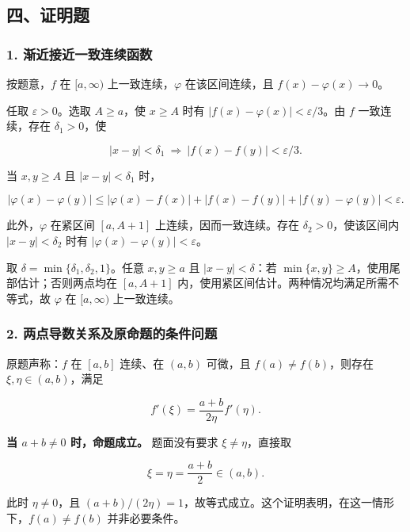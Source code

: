 \documentclass[11pt,fontset=fandol]{ctexart}
\begin{document}
\subsection{四、证明题}\label{ux56dbux8bc1ux660eux9898}

\subsubsection{1.
渐近接近一致连续函数}\label{ux6e10ux8fd1ux63a5ux8fd1ux4e00ux81f4ux8fdeux7eedux51fdux6570}

按题意，\(f\) 在 \([a,\infty)\) 上一致连续，\(\varphi\) 在该区间连续，且
\(f(x)-\varphi(x)\to0\)。

任取 \(\varepsilon>0\)。选取 \(A\ge a\)，使 \(x\ge A\) 时有
\(|f(x)-\varphi(x)|<\varepsilon/3\)。由 \(f\) 一致连续，存在
\(\delta_1>0\)，使

\[
|x-y|<\delta_1\ \Longrightarrow\ |f(x)-f(y)|<\varepsilon/3.
\]

当 \(x,y\ge A\) 且 \(|x-y|<\delta_1\) 时，

\[
|\varphi(x)-\varphi(y)|
\le|\varphi(x)-f(x)|+|f(x)-f(y)|+|f(y)-\varphi(y)|<\varepsilon.
\]

此外，\(\varphi\) 在紧区间 \([a,A+1]\) 上连续，因而一致连续。存在
\(\delta_2>0\)，使该区间内 \(|x-y|<\delta_2\) 时有
\(|\varphi(x)-\varphi(y)|<\varepsilon\)。

取 \(\delta=\min\{\delta_1,\delta_2,1\}\)。任意 \(x,y\ge a\) 且
\(|x-y|<\delta\)：若 \(\min\{x,y\}\ge A\)，使用尾部估计；否则两点均在
\([a,A+1]\) 内，使用紧区间估计。两种情况均满足所需不等式，故 \(\varphi\)
在 \([a,\infty)\) 上一致连续。

\subsubsection{2.
两点导数关系及原命题的条件问题}\label{ux4e24ux70b9ux5bfcux6570ux5173ux7cfbux53caux539fux547dux9898ux7684ux6761ux4ef6ux95eeux9898}

原题声称：\(f\) 在 \([a,b]\) 连续、在 \((a,b)\) 可微，且
\(f(a)\ne f(b)\)，则存在 \(\xi,\eta\in(a,b)\)，满足

\[
f'(\xi)=\frac{a+b}{2\eta}f'(\eta).
\]

\textbf{当 \(a+b\ne0\) 时，命题成立。} 题面没有要求
\(\xi\ne\eta\)，直接取

\[
\xi=\eta=\frac{a+b}{2}\in(a,b).
\]

此时 \(\eta\ne0\)，且
\((a+b)/(2\eta)=1\)，故等式成立。这个证明表明，在这一情形下，\(f(a)\ne f(b)\)
并非必要条件。
\end{document}
